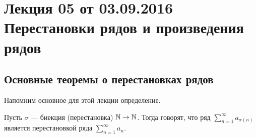 \documentclass[a4paper, 12pt]{article}
\begin{document}
\pagestyle{fancy}
\section{Лекция 05 от 03.09.2016 \\ Перестановки рядов и произведения рядов}
\subsection{Основные теоремы о перестановках рядов}
Напомним основное для этой лекции определение.
	\begin{Def}
		Пусть $\sigma$ --- биекция (перестановка) $\mathbb{N} \to \mathbb{N}$. Тогда говорят, что ряд $\sum\limits_{n=1}^{\infty}a_{\sigma(n)}$ является перестановкой ряда $\sum\limits_{n=1}^{\infty}a_n$.
	\end{Def}
\end{document}
